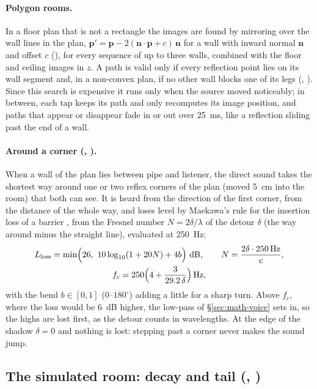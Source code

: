 \paragraph{Polygon rooms.} In a floor plan that is not a rectangle the images are found by mirroring over the wall
lines in the plan, $\mathbf p' = \mathbf p - 2(\mathbf n\cdot\mathbf p + c)\,\mathbf n$ for a wall with inward normal
$\mathbf n$ and offset $c$ (), for every sequence of up to three walls, combined with the floor and
ceiling images in $z$. A path is valid only if every reflection point lies on its wall segment and, in a non-convex
plan, if no other wall blocks one of its legs (, ). Since this search is expensive
it runs only when the source moved noticeably; in between, each tap keeps its path and only recomputes its image
position, and paths that appear or disappear fade in or out over \SI{25}{ms}, like a reflection sliding past the end of
a wall.

\paragraph{Around a corner (, ).} When a wall of the plan lies between pipe and
listener, the direct sound takes the shortest way around one or two reflex corners of the plan (moved \SI{5}{cm} into
the room) that both can see. It is heard from the direction of the first corner, from the distance of the whole way,
and loses level by Maekawa's rule for the insertion loss of a barrier \citep{maekawa1968}, from the Fresnel number
$N = 2\delta/\lambda$ of the detour $\delta$ (the way around minus the straight line), evaluated at \SI{250}{Hz}:
\begin{gather}
  L_\mathrm{loss} = \min\Bigl(26,\ 10\log_{10}(1+20N) + 4b\Bigr)\ \mathrm{dB},\qquad
  N = \frac{2\delta\cdot\SI{250}{Hz}}{c},\\
  f_c = 250\Bigl(4 + \frac{3}{29.2\,\delta}\Bigr)\,\mathrm{Hz},
\end{gather}
with the bend $b\in[0,1]$ ($0$--$180^\circ$) adding a little for a sharp turn. Above $f_c$, where the loss would be
\SI{6}{dB} higher, the low-pass of \S\ref{sec:math-voice} sets in, so the highs are lost first, as the detour counts in
wavelengths. At the edge of the shadow $\delta = 0$ and nothing is lost: stepping past a corner never makes the sound jump.

\subsection{The simulated room: decay and tail (, )}
\label{sec:math-tail}

